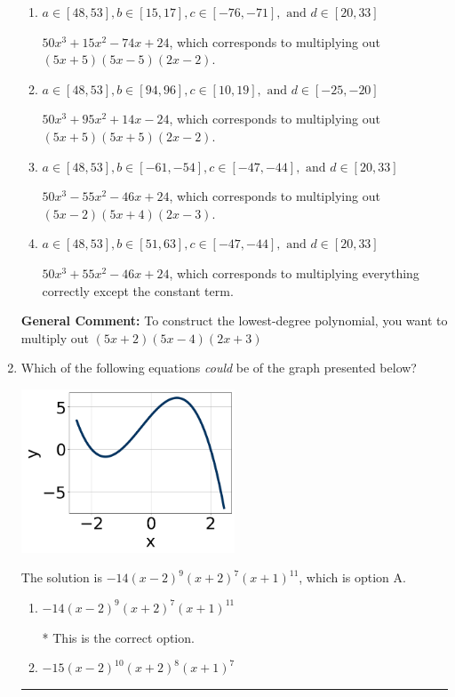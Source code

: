 \documentclass{extbook}[14pt]
\newcommand{\litem}[1]{\item #1

\rule{\textwidth}{0.4pt}}
\begin{document}
\begin{enumerate}
{\begin{enumerate}[label=\Alph*.]
* $50x^{3} +55 x^{2} -46 x -24$, which is the correct option.
\item \( a \in [48, 53], b \in [15, 17], c \in [-76, -71], \text{ and } d \in [20, 33] \)

$50x^{3} +15 x^{2} -74 x + 24$, which corresponds to multiplying out $(5x + 5)(5x -5)(2x -2)$.
\item \( a \in [48, 53], b \in [94, 96], c \in [10, 19], \text{ and } d \in [-25, -20] \)

$50x^{3} +95 x^{2} +14 x -24$, which corresponds to multiplying out $(5x + 5)(5x + 5)(2x -2)$.
\item \( a \in [48, 53], b \in [-61, -54], c \in [-47, -44], \text{ and } d \in [20, 33] \)

$50x^{3} -55 x^{2} -46 x + 24$, which corresponds to multiplying out $(5x -2)(5x + 4)(2x -3)$.
\item \( a \in [48, 53], b \in [51, 63], c \in [-47, -44], \text{ and } d \in [20, 33] \)

$50x^{3} +55 x^{2} -46 x + 24$, which corresponds to multiplying everything correctly except the constant term.
\end{enumerate}

\textbf{General Comment:} To construct the lowest-degree polynomial, you want to multiply out $(5x + 2)(5x -4)(2x + 3)$
}
\litem{
Which of the following equations \textit{could} be of the graph presented below?

\begin{center}
    \includegraphics[width=0.5\textwidth]{../Figures/polyGraphToFunctionA.png}
\end{center}




The solution is \( -14(x - 2)^{9} (x + 2)^{7} (x + 1)^{11} \), which is option A.\begin{enumerate}[label=\Alph*.]
\item \( -14(x - 2)^{9} (x + 2)^{7} (x + 1)^{11} \)

* This is the correct option.
\item \( -15(x - 2)^{10} (x + 2)^{8} (x + 1)^{7} \)


\end{enumerate}}
\end{enumerate}
\end{document}
